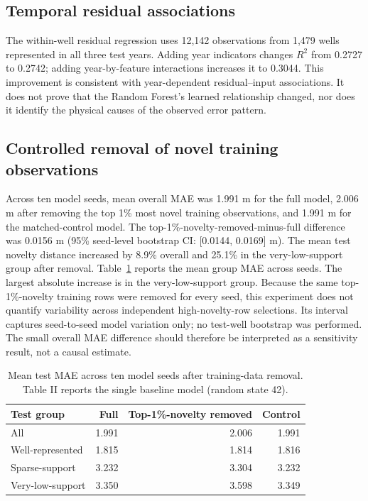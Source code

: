 \documentclass[conference]{IEEEtran}
\begin{document}
\subsection{Temporal residual associations}
The within-well residual regression uses 12,142 observations from 1,479 wells represented in all three test years. Adding year indicators changes $R^2$ from 0.2727 to 0.2742; adding year-by-feature interactions increases it to 0.3044. This improvement is consistent with year-dependent residual--input associations. It does not prove that the Random Forest's learned relationship changed, nor does it identify the physical causes of the observed error pattern.

\subsection{Controlled removal of novel training observations}
Across ten model seeds, mean overall MAE was 1.991 m for the full model, 2.006 m after removing the top 1\% most novel training observations, and 1.991 m for the matched-control model. The top-1\%-novelty-removed-minus-full difference was 0.0156 m (95\% seed-level bootstrap CI: [0.0144, 0.0169] m). The mean test novelty distance increased by 8.9\% overall and 25.1\% in the very-low-support group after removal. Table~\ref{tab:removal} reports the mean group MAE across seeds. The largest absolute increase is in the very-low-support group. Because the same top-1\%-novelty training rows were removed for every seed, this experiment does not quantify variability across independent high-novelty-row selections. Its interval captures seed-to-seed model variation only; no test-well bootstrap was performed. The small overall MAE difference should therefore be interpreted as a sensitivity result, not a causal estimate.

\begin{table}[t]
\caption{Mean test MAE across ten model seeds after training-data removal. Table II reports the single baseline model (random state 42).}
\label{tab:removal}
\centering
\footnotesize
\begin{tabular}{lrrr}
\toprule
Test group & Full & Top-1\%-novelty removed & Control\\
\midrule
All & 1.991 & 2.006 & 1.991\\
Well-represented & 1.815 & 1.814 & 1.816\\
Sparse-support & 3.232 & 3.304 & 3.232\\
Very-low-support & 3.350 & 3.598 & 3.349\\
\bottomrule
\end{tabular}
\end{table}
\end{document}
